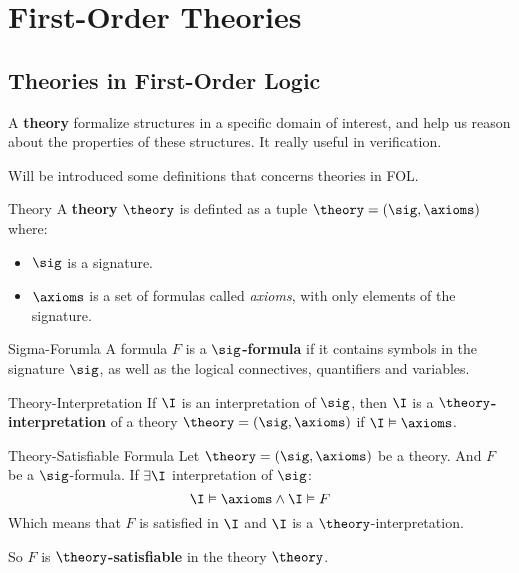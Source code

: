 \chapter{First-Order Theories}
\label{cha:First-Order Theories}

\section{Theories in First-Order Logic}
\label{sec:Theories in First-Order Logic}

A \textbf{theory} formalize structures in a specific domain of interest, 
and help us reason about the properties of these structures.
It really useful in verification.

Will be introduced some definitions that concerns theories in FOL.

\begin{definition}{Theory}
    A \textbf{theory} $\theory$ is definted as a tuple $\theory = (\sig,\axioms)$ where:
    \begin{itemize}
        \item $\sig$ is a signature.
        \item $\axioms$ is a set of formulas called \textit{axioms},
        with only elements of the signature.
    \end{itemize}
\end{definition}

\begin{definition}{Sigma-Forumla}
    A formula $F$ is a \textbf{$\sig$-formula} if it contains symbols in
    the signature $\sig$,
    as well as the logical connectives, quantifiers and variables.
\end{definition}

\begin{definition}{Theory-Interpretation}
    If $\I$ is an interpretation of $\sig$, then $\I$ is a \textbf{$\theory$-interpretation}
    of a theory $\theory = (\sig,\axioms)$ if $\I \vDash \axioms$.
\end{definition}

\begin{definition}{Theory-Satisfiable Formula}
    Let $\theory = (\sig,\axioms)$ be a theory. And $F$ be a $\sig$-formula.
    If $\exists \I$ interpretation of $\sig$:
    \begin{equation*}
        \I \vDash \axioms \land \I \vDash F
    \end{equation*}
    Which means that $F$ is satisfied in $\I$ and $\I$ is a $\theory$-interpretation.

    So $F$ is \textbf{$\theory$-satisfiable} in the theory $\theory$.
\end{definition}

